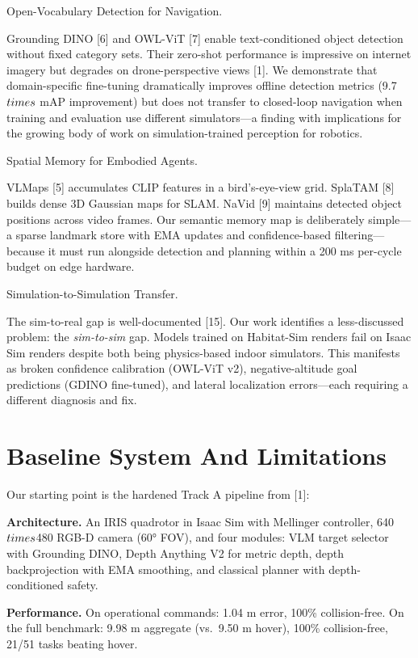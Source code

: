 \documentclass[conference]{IEEEtran}
\begin{document}
Open-Vocabulary Detection for Navigation.

Grounding DINO [6] and OWL-ViT [7] enable text-conditioned
object detection without fixed category sets. Their zero-shot
performance is impressive on internet imagery but degrades on
drone-perspective views [1]. We demonstrate that domain-specific
fine-tuning dramatically improves offline detection metrics (9.7$\\times$ mAP
improvement) but does not transfer to closed-loop navigation when
training and evaluation use different simulators---a finding with
implications for the growing body of work on simulation-trained
perception for robotics.

Spatial Memory for Embodied Agents.

VLMaps [5] accumulates CLIP features in a bird's-eye-view grid.
SplaTAM [8] builds dense 3D Gaussian maps for SLAM. NaVid [9]
maintains detected object positions across video frames. Our semantic
memory map is deliberately simple---a sparse landmark store with EMA
updates and confidence-based filtering---because it must run alongside
detection and planning within a 200 ms per-cycle budget on edge
hardware.

Simulation-to-Simulation Transfer.

The sim-to-real gap is well-documented [15]. Our work identifies a
less-discussed problem: the \emph{sim-to-sim} gap. Models trained on
Habitat-Sim renders fail on Isaac Sim renders despite both being
physics-based indoor simulators. This manifests as broken confidence
calibration (OWL-ViT v2), negative-altitude goal predictions (GDINO
fine-tuned), and lateral localization errors---each requiring a
different diagnosis and fix.

\section{Baseline System And Limitations}\label{iii.-baseline-system-and-limitations}

Our starting point is the hardened Track A pipeline from [1]:

\textbf{Architecture.} An IRIS quadrotor in Isaac Sim with Mellinger
controller, 640$\\times$480 RGB-D camera (60° FOV), and four modules: VLM target
selector with Grounding DINO, Depth Anything V2 for metric depth, depth
backprojection with EMA smoothing, and classical planner with
depth-conditioned safety.

\textbf{Performance.} On operational commands: 1.04 m error, 100\%
collision-free. On the full benchmark: 9.98 m aggregate (vs.~9.50 m
hover), 100\% collision-free, 21/51 tasks beating hover.
\end{document}
